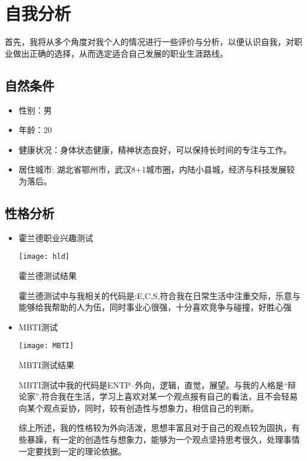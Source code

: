 \documentclass{article}
\begin{document}
\thispagestyle{empty}
\newpage
\setcounter{page}{1}
\section{自我分析}
	首先，我将从多个角度对我个人的情况进行一些评价与分析，以便认识自我，对职业做出正确的选择，从而选定适合自己发展的职业生涯路线。
\subsection{自然条件}
\begin{itemize}
\item 性别：男
\item 年龄：20
\item 健康状况：身体状态健康，精神状态良好，可以保持长时间的专注与工作。
\item 居住城市: 湖北省鄂州市，武汉8+1城市圈，内陆小县城，经济与科技发展较为落后。

\end{itemize}
\subsection{性格分析}
\begin{itemize}
\item 霍兰德职业兴趣测试

\begin{center}
    \centering
    \texttt{[image: hld]}
    \caption{霍兰德测试结果}
 
    \end{center}
    
霍兰德测试中与我相关的代码是:E,C,S,符合我在日常生活中注重交际，乐意与能够给我帮助的人为伍，同时事业心很强，十分喜欢竞争与碰撞，好胜心强

\item MBTI测试

\begin{center}
    \centering
    \texttt{[image: MBTI]}
    \caption{MBTI测试结果}
 
    \end{center}

MBTI测试中我的代码是ENTP--外向，逻辑，直觉，展望。与我的人格是“辩论家”,符合我在生活，学习上喜欢对某一个观点报有自己的看法，且不会轻易向某个观点妥协，同时，较有创造性与想象力，相信自己的判断。

综上所述，我的性格较为外向活泼，思想丰富且对于自己的观点较为固执，有些暴躁，有一定的创造性与想象力，能够为一个观点坚持思考很久，处理事情一定要找到一定的理论依据。
\end{itemize}
\par
\end{document}
